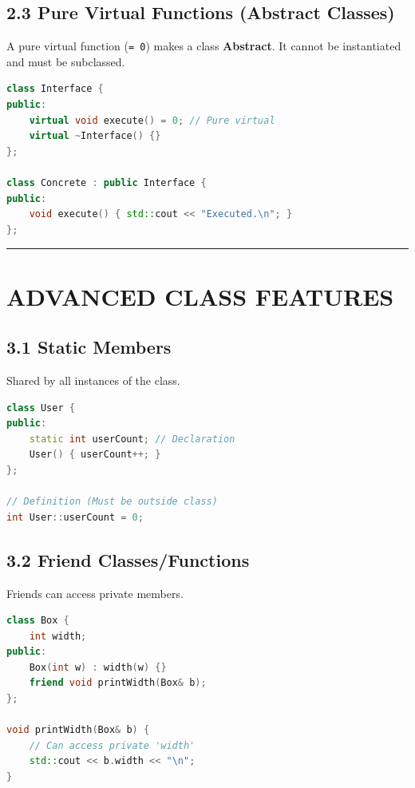 \hypertarget{pure-virtual-functions-abstract-classes}{%
\subsection{2.3 Pure Virtual Functions (Abstract
Classes)}\label{pure-virtual-functions-abstract-classes}}

A pure virtual function (\passthrough{\lstinline!= 0!}) makes a class
\textbf{Abstract}. It cannot be instantiated and must be subclassed.

\begin{lstlisting}[language={C++}]
class Interface {
public:
    virtual void execute() = 0; // Pure virtual
    virtual ~Interface() {}
};

class Concrete : public Interface {
public:
    void execute() { std::cout << "Executed.\n"; }
};
\end{lstlisting}

\begin{center}\rule{0.5\linewidth}{0.5pt}\end{center}

\hypertarget{advanced-class-features}{%
\section{ADVANCED CLASS FEATURES}\label{advanced-class-features}}

\hypertarget{static-members}{%
\subsection{3.1 Static Members}\label{static-members}}

Shared by all instances of the class.

\begin{lstlisting}[language={C++}]
class User {
public:
    static int userCount; // Declaration
    User() { userCount++; }
};

// Definition (Must be outside class)
int User::userCount = 0;
\end{lstlisting}

\hypertarget{friend-classesfunctions}{%
\subsection{3.2 Friend
Classes/Functions}\label{friend-classesfunctions}}

Friends can access private members.

\begin{lstlisting}[language={C++}]
class Box {
    int width;
public:
    Box(int w) : width(w) {}
    friend void printWidth(Box& b);
};

void printWidth(Box& b) {
    // Can access private 'width'
    std::cout << b.width << "\n";
}
\end{lstlisting}


